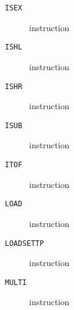 \clearpage
\begin{description}
\item[\texttt{ISEX}] instruction\\

\end{description}
\clearpage
\begin{description}
\item[\texttt{ISHL}] instruction\\

\end{description}
\clearpage
\begin{description}
\item[\texttt{ISHR}] instruction\\

\end{description}
\clearpage
\begin{description}
\item[\texttt{ISUB}] instruction\\

\end{description}
\clearpage
\begin{description}
\item[\texttt{ITOF}] instruction\\

\end{description}
\clearpage
\begin{description}
\item[\texttt{LOAD}] instruction\\

\end{description}
\clearpage
\begin{description}
\item[\texttt{LOADSETTP}] instruction\\

\end{description}
\clearpage
\begin{description}
\item[\texttt{MULTI}] instruction\\

\end{description}
\clearpage
